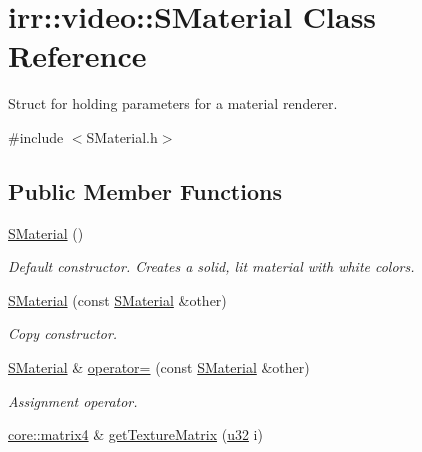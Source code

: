 \hypertarget{classirr_1_1video_1_1SMaterial}{}\section{irr\+:\+:video\+:\+:S\+Material Class Reference}
\label{classirr_1_1video_1_1SMaterial}


Struct for holding parameters for a material renderer.  




{\ttfamily \#include $<$S\+Material.\+h$>$}

\subsection*{Public Member Functions}
\begin{DoxyCompactItemize}
\item 
\mbox{\label{classirr_1_1video_1_1SMaterial_ae5002c3c8ea002539228a9ca95cc8003}} 
\hyperlink{classirr_1_1video_1_1SMaterial_ae5002c3c8ea002539228a9ca95cc8003}{S\+Material} ()
\begin{DoxyCompactList}\small\item\em Default constructor. Creates a solid, lit material with white colors. \end{DoxyCompactList}\item 
\hyperlink{classirr_1_1video_1_1SMaterial_a66f175294b99e3cc2816e9cc0f372ce3}{S\+Material} (const \hyperlink{classirr_1_1video_1_1SMaterial}{S\+Material} \&other)
\begin{DoxyCompactList}\small\item\em Copy constructor. \end{DoxyCompactList}\item 
\hyperlink{classirr_1_1video_1_1SMaterial}{S\+Material} \& \hyperlink{classirr_1_1video_1_1SMaterial_a752ea337daa705d8d7035f0ee93d178d}{operator=} (const \hyperlink{classirr_1_1video_1_1SMaterial}{S\+Material} \&other)
\begin{DoxyCompactList}\small\item\em Assignment operator. \end{DoxyCompactList}\item 
\hyperlink{namespaceirr_1_1core_a4c9d4e29899535971052810954a14431}{core\+::matrix4} \& \hyperlink{classirr_1_1video_1_1SMaterial_a102aec38ea69a7c609edfad74b40463c}{get\+Texture\+Matrix} (\hyperlink{namespaceirr_a0416a53257075833e7002efd0a18e804}{u32} i)

\end{DoxyCompactItemize}
